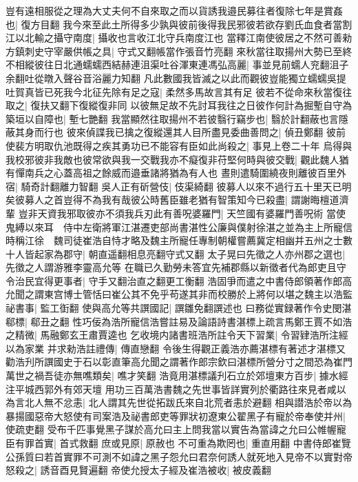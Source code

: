 豈有遠相服從之理為大丈夫何不自來取之而以貨誘我邉民募往者復除七年是賞姦也|{
	復方目翻}
我今來至此土所得多少孰與彼前後得我民邪彼若欲存劉氏血食者當割江以北輸之攝守南度|{
	攝收也言收江北守兵南度江也}
當釋江南使彼居之不然可善勑方鎮刺史守宰嚴供帳之具|{
	守式又翻帳當作張音竹亮翻}
來秋當往取揚州大勢已至終不相縱彼往日北通蠕蠕西結赫連沮渠吐谷渾東連馮弘高麗|{
	事並見前蠕人兖翻沮子余翻吐從暾入聲谷音浴麗力知翻}
凡此數國我皆滅之以此而觀彼豈能獨立蠕蠕吳提吐賀真皆已死我今北征先除有足之寇|{
	柔然多馬故言其有足}
彼若不從命來秋當復往取之|{
	復扶又翻下復縱復非同}
以彼無足故不先討耳我往之日彼作何計為掘塹自守為築垣以自障也|{
	塹七艷翻}
我當顯然往取揚州不若彼翳行竊步也|{
	翳於計翻蔽也言隱蔽其身而行也}
彼來偵諜我已擒之復縱還其人目所盡見委曲善問之|{
	偵丑鄭翻}
彼前使裴方明取仇池既得之疾其勇功已不能容有臣如此尚殺之|{
	事見上卷二十年}
烏得與我校邪彼非我敵也彼常欲與我一交戰我亦不癡復非苻堅何時與彼交戰|{
	觀此魏人猶有憚南兵之心蓋高祖之餘威而邉垂諸將猶為有人也}
晝則遣騎圍繞夜則離彼百里外宿|{
	騎奇計翻離力智翻}
吳人正有斫營伎|{
	伎渠綺翻}
彼募人以來不過行五十里天已明矣彼募人之首豈得不為我有哉彼公時舊臣雖老猶有智策知今已殺盡|{
	謂謝晦檀道濟輩}
豈非天資我邪取彼亦不須我兵刃此有善呪婆羅門|{
	天竺國有婆羅門善呪術}
當使鬼縛以來耳　侍中左衛將軍江湛遷吏部尚書湛性公廉與僕射徐湛之並為主上所寵信時稱江徐　魏司徒崔浩自恃才略及魏主所寵任專制朝權嘗薦冀定相幽并五州之士數十人皆起家為郡守|{
	朝直遥翻相息亮翻守式又翻}
太子晃曰先徵之人亦州郡之選也|{
	先徵之人謂游雅李靈高允等}
在職已久勤勞未答宜先補郡縣以新徵者代為郎吏且守令治民宜得更事者|{
	守手又翻治直之翻更工衡翻}
浩固爭而遣之中書侍郎領著作郎高允聞之謂東宫博士管恬曰崔公其不免乎苟遂其非而校勝於上將何以堪之魏主以浩監祕書事|{
	監工衘翻}
使與高允等共譔國記|{
	譔雛免翻譔述也}
曰務從實録著作令史閔湛郗標|{
	郗丑之翻}
性巧佞為浩所寵信浩嘗註易及論語詩書湛標上疏言馬鄭王賈不如浩之精微|{
	馬融鄭玄王肅賈逵也}
乞收境内諸書班浩所註令天下習業|{
	令習肄浩所注經以為家業}
并求勑浩註禮傳|{
	傳直戀翻}
令後生得觀正義浩亦薦湛標有著述才湛標又勸浩刋所譔國史于石以彰直筆高允聞之謂著作郎宗欽曰湛標所營分寸之間恐為崔門萬世之禍吾徒亦無噍類矣|{
	噍才笑翻}
浩竟用湛標議刋石立於郊壇東方百步|{
	據水經注平城西郭外有郊天壇}
用功三百萬浩書魏之先世事皆詳實列於衢路往來見者咸以為言北人無不忿恚|{
	北人謂其先世從拓跋氏來自北荒者恚於避翻}
相與譛浩於帝以為暴揚國惡帝大怒使有司案浩及祕書郎吏等罪狀初遼東公翟黑子有寵於帝奉使并州|{
	使疏吏翻}
受布千匹事覺黑子謀於高允曰主上問我當以實告為當諱之允曰公帷幄寵臣有罪首實|{
	首式救翻}
庶或見原|{
	原赦也}
不可重為欺罔也|{
	重直用翻}
中書侍郎崔覽公孫質曰若首實罪不可測不如諱之黑子怨允曰君奈何誘人就死地入見帝不以實對帝怒殺之|{
	誘音酉見賢遍翻}
帝使允授太子經及崔浩被收|{
	被皮義翻}
